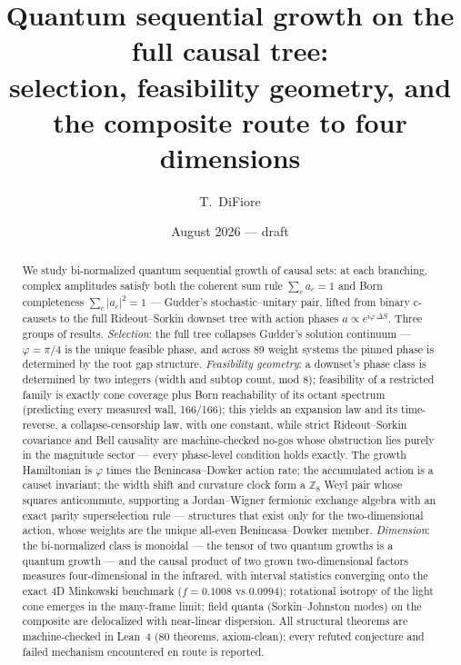 \documentclass[11pt]{article}
\title{Quantum sequential growth on the full causal tree:\\
selection, feasibility geometry, and the composite route to four
dimensions}
\author{T.~DiFiore}
\date{August 2026 --- draft}
\newcommand{\Z}{\mathbb{Z}}
\begin{document}
\maketitle

\begin{abstract}
We study bi-normalized quantum sequential growth of causal sets: at
each branching, complex amplitudes satisfy both the coherent sum rule
$\sum_c a_c=1$ and Born completeness $\sum_c\lvert a_c\rvert^2=1$ ---
Gudder's stochastic--unitary pair, lifted from binary c-causets to the
full Rideout--Sorkin downset tree with action phases
$a\propto e^{i\varphi\,\Delta S}$.  Three groups of results.
\emph{Selection}: the full tree collapses Gudder's solution continuum
--- $\varphi=\pi/4$ is the unique feasible phase, and across 89 weight
systems the pinned phase is determined by the root gap structure.
\emph{Feasibility geometry}: a downset's phase class is determined by
two integers (width and subtop count, mod 8); feasibility of a
restricted family is exactly cone coverage plus Born reachability of
its octant spectrum (predicting every measured wall, 166/166); this
yields an expansion law and its time-reverse, a collapse-censorship
law, with one constant, while strict Rideout--Sorkin covariance and
Bell causality are machine-checked no-gos whose obstruction lies
purely in the magnitude sector --- every phase-level condition holds
exactly.  The growth Hamiltonian is $\varphi$ times the
Benincasa--Dowker action rate; the accumulated action is a causet
invariant; the width shift and curvature clock form a $\Z_8$ Weyl
pair whose squares anticommute, supporting a Jordan--Wigner fermionic
exchange algebra with an exact parity superselection rule ---
structures that exist only for the two-dimensional action, whose
weights are the unique all-even Benincasa--Dowker member.
\emph{Dimension}: the bi-normalized class is monoidal --- the tensor
of two quantum growths is a quantum growth --- and the causal product
of two grown two-dimensional factors measures four-dimensional in the
infrared, with interval statistics converging onto the exact 4D
Minkowski benchmark ($f=0.1008$ vs $0.0994$); rotational isotropy of
the light cone emerges in the many-frame limit; field quanta
(Sorkin--Johnston modes) on the composite are delocalized with
near-linear dispersion.  All structural theorems are machine-checked
in Lean~4 (80 theorems, axiom-clean); every refuted conjecture and
failed mechanism encountered en route is reported.
\end{abstract}
\end{document}
